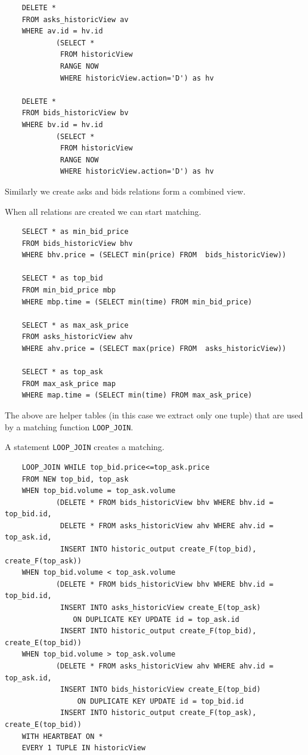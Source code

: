 \documentclass{article}
\begin{document}
\begin{verbatim}  
    DELETE *
    FROM asks_historicView av
    WHERE av.id = hv.id
            (SELECT * 
             FROM historicView
             RANGE NOW
             WHERE historicView.action='D') as hv  

    DELETE *
    FROM bids_historicView bv
    WHERE bv.id = hv.id
            (SELECT * 
             FROM historicView
             RANGE NOW
             WHERE historicView.action='D') as hv 
\end{verbatim}

Similarly we create asks and bids relations form a combined view. 

When all relations are created we can start matching.

\begin{verbatim}      
    SELECT * as min_bid_price
    FROM bids_historicView bhv
    WHERE bhv.price = (SELECT min(price) FROM  bids_historicView))
    
    SELECT * as top_bid
    FROM min_bid_price mbp
    WHERE mbp.time = (SELECT min(time) FROM min_bid_price)
    
    SELECT * as max_ask_price
    FROM asks_historicView ahv
    WHERE ahv.price = (SELECT max(price) FROM  asks_historicView))
    
    SELECT * as top_ask
    FROM max_ask_price map
    WHERE map.time = (SELECT min(time) FROM max_ask_price)
\end{verbatim}

The above are helper tables (in this case we extract only one tuple) that are used by a matching function {\tt LOOP\_JOIN}.

A statement {\tt LOOP\_JOIN} creates a matching. 

\begin{verbatim}  
    LOOP_JOIN WHILE top_bid.price<=top_ask.price
    FROM NEW top_bid, top_ask
    WHEN top_bid.volume = top_ask.volume 
            (DELETE * FROM bids_historicView bhv WHERE bhv.id = top_bid.id,
             DELETE * FROM asks_historicView ahv WHERE ahv.id = top_ask.id,
             INSERT INTO historic_output create_F(top_bid), create_F(top_ask))
    WHEN top_bid.volume < top_ask.volume 
            (DELETE * FROM bids_historicView bhv WHERE bhv.id = top_bid.id,
             INSERT INTO asks_historicView create_E(top_ask) 
                ON DUPLICATE KEY UPDATE id = top_ask.id
             INSERT INTO historic_output create_F(top_bid), create_E(top_bid))
    WHEN top_bid.volume > top_ask.volume 
            (DELETE * FROM asks_historicView ahv WHERE ahv.id = top_ask.id,
             INSERT INTO bids_historicView create_E(top_bid) 
                 ON DUPLICATE KEY UPDATE id = top_bid.id
             INSERT INTO historic_output create_F(top_ask), create_E(top_bid))
    WITH HEARTBEAT ON *
    EVERY 1 TUPLE IN historicView
\end{verbatim}
\end{document}
